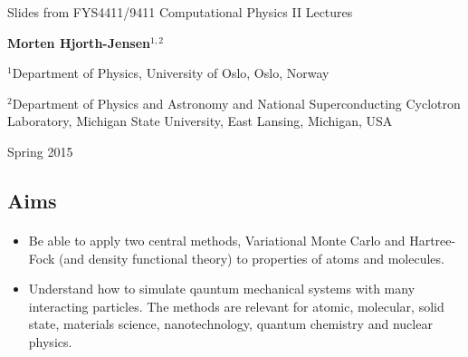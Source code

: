 \documentclass[%
twoside,                 %
final,                   %
10pt]{article}
\begin{document}




\thispagestyle{empty}

\begin{center}
{\LARGE\bf
\begin{spacing}{1.25}
Slides from FYS4411/9411 Computational Physics II Lectures
\end{spacing}
}
\end{center}


\begin{center}
{\bf Morten Hjorth-Jensen${}^{1, 2}$} \\ [0mm]
\end{center}

    \begin{center}
\centerline{{\small ${}^1$Department of Physics, University of Oslo, Oslo, Norway}}
\centerline{{\small ${}^2$Department of Physics and Astronomy and National Superconducting Cyclotron Laboratory, Michigan State University, East Lansing, Michigan, USA}}
\end{center}
    

\begin{center} %
Spring 2015
\end{center}

\vspace{1cm}


\subsection*{Aims}

\paragraph{}
\begin{itemize}
\item Be able to apply two central methods, Variational Monte Carlo and Hartree-Fock (and density functional theory) to properties of atoms and molecules.

\item Understand how to simulate qauntum mechanical systems with many interacting particles. The methods are relevant for atomic, molecular, solid state, materials science, nanotechnology, quantum chemistry  and nuclear physics. 
\end{itemize}
\end{document}
